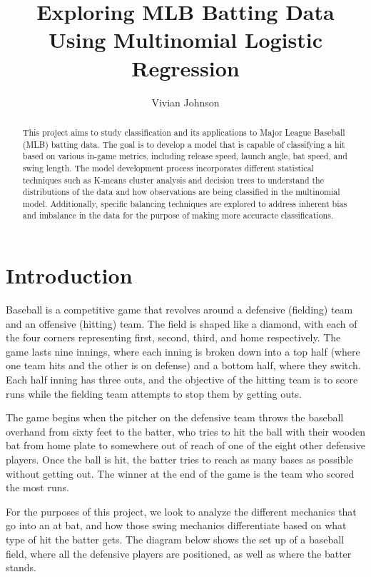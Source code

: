 \documentclass[
  letterpaper,
  DIV=11,
  numbers=noendperiod]{scrartcl}
\title{Exploring MLB Batting Data Using Multinomial Logistic Regression}
\author{Vivian Johnson}
\date{}
\begin{document}
\maketitle
\begin{abstract}
This project aims to study classification and its applications to Major
League Baseball (MLB) batting data. The goal is to develop a model that
is capable of classifying a hit based on various in-game metrics,
including release speed, launch angle, bat speed, and swing length. The
model development process incorporates different statistical techniques
such as K-means cluster analysis and decision trees to understand the
distributions of the data and how observations are being classified in
the multinomial model. Additionally, specific balancing techniques are
explored to address inherent bias and imbalance in the data for the
purpose of making more accuracte classifications.
\end{abstract}

\newpage

\setcounter{tocdepth}{4}
\tableofcontents

\newpage

\section{Introduction}\label{introduction}

Baseball is a competitive game that revolves around a defensive
(fielding) team and an offensive (hitting) team. The field is shaped
like a diamond, with each of the four corners representing first,
second, third, and home respectively. The game lasts nine innings, where
each inning is broken down into a top half (where one team hits and the
other is on defense) and a bottom half, where they switch. Each half
inning has three outs, and the objective of the hitting team is to score
runs while the fielding team attempts to stop them by getting outs.

The game begins when the pitcher on the defensive team throws the
baseball overhand from sixty feet to the batter, who tries to hit the
ball with their wooden bat from home plate to somewhere out of reach of
one of the eight other defensive players. Once the ball is hit, the
batter tries to reach as many bases as possible without getting out. The
winner at the end of the game is the team who scored the most runs.

For the purposes of this project, we look to analyze the different
mechanics that go into an at bat, and how those swing mechanics
differentiate based on what type of hit the batter gets. The diagram
below shows the set up of a baseball field, where all the defensive
players are positioned, as well as where the batter stands.
\end{document}
